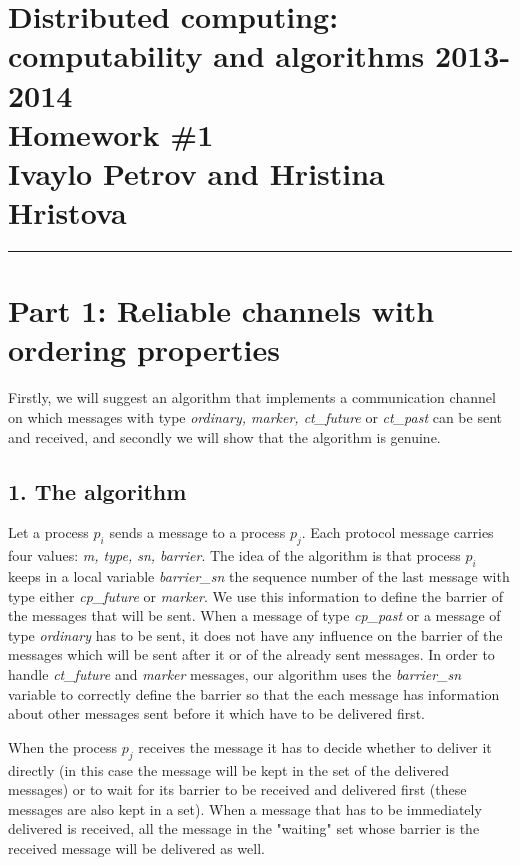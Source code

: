 \documentclass[12pt]{article}
\newcommand{\hr}{\rule{\linewidth}{0.1mm}}
\theoremstyle{plain}
\begin{document}
\section*{\centering
  Distributed computing: computability and algorithms 2013-2014 \\
  Homework \#1 \\
  Ivaylo Petrov and Hristina Hristova 
}

\hr

\section*{\textbf{Part 1: Reliable channels with ordering properties}
}

  Firstly, we will suggest an algorithm that implements a communication channel 
  on which messages with type \emph{ordinary, marker, ct\_future} or 
  \emph{ct\_past} can be sent and received, and secondly we will show that the
  algorithm is genuine.

\subsection*{1. The algorithm}

Let a process $p_i$ sends a message to a process $p_j$. Each protocol message
carries four values: \emph{m, type, sn, barrier}. The idea of the algorithm
is that process $p_i$ keeps in a local variable \emph{barrier\_sn} the
sequence number of the last message with type either \emph{cp\_future} or
\emph{marker}. We use this information to define the barrier of the messages
that will be sent. When a message of type \emph{cp\_past} or a message of
type \emph{ordinary} has to be sent, it does not have any influence on the
barrier of the messages which will be sent after it or of the already sent
messages. In order to handle \emph{ct\_future} and \emph{marker} messages,
our algorithm uses the \emph{barrier\_sn} variable to correctly define the
barrier so that the each message has information about other messages
sent before it which have to be delivered first.

When the process $p_j$ receives the message it has to decide whether to
deliver it directly (in this case the message will be kept in the set of the
delivered messages) or to wait for its barrier to be received and delivered
first (these messages are also kept in a set). When a message that has to be
immediately delivered is received, all the message in the "waiting" set
whose barrier is the received message will be delivered as well.
\end{document}
